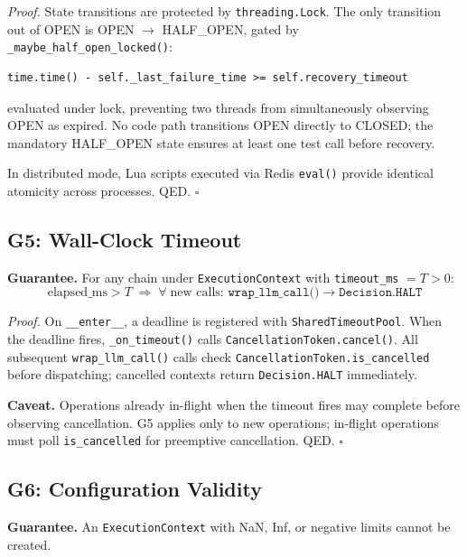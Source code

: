 \documentclass[11pt]{article}
\newenvironment{proof}{\par\noindent\textit{Proof.}\enspace}{\hfill$\square$\par\medskip}
\begin{document}
\begin{proof}
State transitions are protected by \texttt{threading.Lock}. The only
transition out of OPEN is OPEN $\to$ HALF\_OPEN, gated by
\texttt{\_maybe\_half\_open\_locked()}:

\begin{lstlisting}
time.time() - self._last_failure_time >= self.recovery_timeout
\end{lstlisting}

evaluated under lock, preventing two threads from simultaneously observing
OPEN as expired. No code path transitions OPEN directly to CLOSED; the
mandatory HALF\_OPEN state ensures at least one test call before recovery.

In distributed mode, Lua scripts executed via Redis \texttt{eval()} provide
identical atomicity across processes. QED.
\end{proof}

\subsection{G5: Wall-Clock Timeout}

\textbf{Guarantee.} For any chain under \texttt{ExecutionContext} with
\texttt{timeout\_ms} $= T > 0$:
\[
  \text{elapsed\_ms} > T \;\Longrightarrow\; \forall\;\text{new calls: } \texttt{wrap\_llm\_call()} \to \texttt{Decision.HALT}
\]

\begin{proof}
On \texttt{\_\_enter\_\_}, a deadline is registered with
\texttt{SharedTimeoutPool}. When the deadline fires, \texttt{\_on\_timeout()}
calls \texttt{CancellationToken.cancel()}. All subsequent
\texttt{wrap\_llm\_call()} calls check
\texttt{CancellationToken.is\_cancelled} before dispatching; cancelled
contexts return \texttt{Decision.HALT} immediately.

\textbf{Caveat.} Operations already in-flight when the timeout fires may
complete before observing cancellation. G5 applies only to new operations;
in-flight operations must poll \texttt{is\_cancelled} for preemptive
cancellation. QED.
\end{proof}

\subsection{G6: Configuration Validity}

\textbf{Guarantee.} An \texttt{ExecutionContext} with NaN, Inf, or negative
limits cannot be created.
\end{document}
